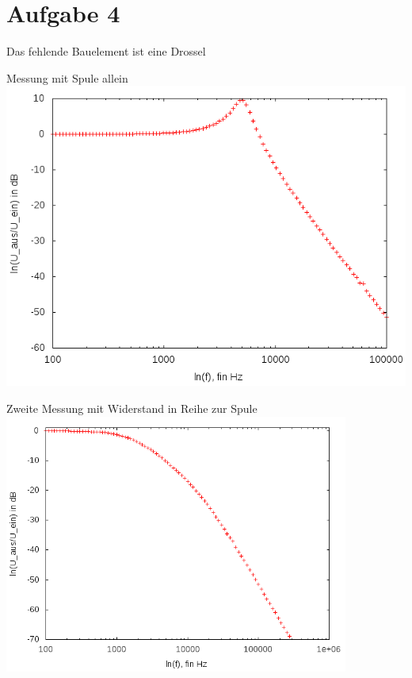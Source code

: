 \documentclass[compress,11pt]{beamer}
\begin{document}
\section{Aufgabe 4}
\begin{frame}
\begin{block}{Das fehlende Bauelement ist eine Drossel}
\centering
\end{block}
\end{frame}

\begin{frame}
\begin{block}{Messung mit Spule allein}
\centering
\includegraphics[width=.85\textwidth]{../daten/Messdaten/plots/Aufgabe4Bodediagramm_tief_gain}
\end{block}
\end{frame}

\begin{frame}
\begin{block}{Zweite Messung mit Widerstand in Reihe zur Spule}
\centering
\includegraphics[width=0.85\textwidth]{../daten/Messdaten/plots/Aufgabe4Bodediagramm_tief_R_gain}
\end{block}
\end{frame}
\end{document}
